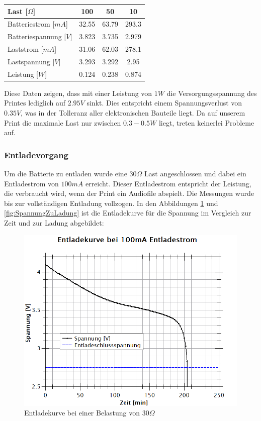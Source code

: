 \begin{table}[h]
\centering
\label{messungen_Energie}
\begin{tabular}{|l|c|c|c|}
\hline
Last [$\Omega$]     & 100   & 50    & 10    \\ \hline
Batteriestrom [$mA$]    & 32.55 & 63.79 & 293.3 \\ \hline
Batteriespannung [$V$] & 3.823 & 3.735 & 2.979 \\ \hline
Laststrom [$mA$] & 31.06 & 62.03 & 278.1 \\ \hline
Lastspannung [$V$]  & 3.293 & 3.292 & 2.95  \\ \hline
Leistung [$W$]  & 0.124 & 0.238 & 0.874  \\ \hline
\end{tabular}
\end{table}

Diese Daten zeigen, dass mit einer Leistung von $1W$ die Versorgungsspannung des Printes lediglich auf $2.95V$ sinkt. Dies entspricht einem Spannungsverlust von  $0.35V$, was in der Tolleranz aller elektronischen Bauteile liegt. Da auf unserem Print die maximale Last nur zwischen $0.3 - 0.5W$ liegt, treten keinerlei Probleme auf.
\newpage


\subsubsection*{Entladevorgang}
Um die Batterie zu entladen wurde eine $30\Omega$ Last angeschlossen und dabei ein Entladestrom von $100mA$ erreicht. Dieser Entladestrom entspricht der Leistung, die verbraucht wird, wenn der Print ein Audiofile abspielt. Die Messungen wurde bis zur vollständigen Entladung vollzogen. 
In den Abbildungen \ref{fig:SpannungZuZeit} und  \ref{fig:SpannungZuLadung} ist die Entladekurve für die Spannung im Vergleich zur Zeit und zur Ladung abgebildet:

\begin{figure}[h]
	\centering
	\includegraphics[width=\textwidth]{graphics/SpannungzuZeit.png}
	\caption{Entladekurve bei einer Belastung von 30$\Omega$}
	\label{fig:SpannungZuZeit}
\end{figure}

